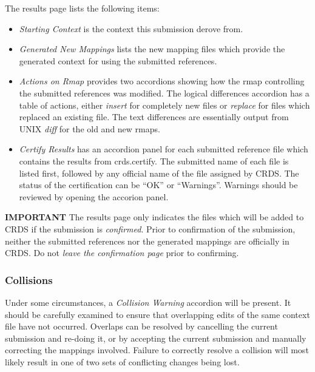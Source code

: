 \documentclass[letterpaper,10pt,english]{sphinxmanual}
\begin{document}
The results page lists the following items:
\begin{itemize}
\item {} 
\emph{Starting Context} is the context this submission derove from.

\item {} 
\emph{Generated New Mappings} lists the new mapping files which provide the generated context for using the submitted references.

\item {} 
\emph{Actions on Rmap} provides two accordions showing how the rmap controlling the submitted references was modified.   The logical differences accordion has a table of actions,  either \emph{insert} for completely new files or \emph{replace} for files which replaced an existing file.   The text differences are essentially output from UNIX \emph{diff} for the old and new rmaps.

\item {} 
\emph{Certify Results} has an accordion panel for each submitted reference file which contains the results from crds.certify.   The submitted name of each file is listed first,  followed by any official name of the file assigned by CRDS.   The status of the certification can be ``OK'' or ``Warnings''.   Warnings should be reviewed by opening the accorion panel.

\end{itemize}

\textbf{IMPORTANT}  The results page only indicates the files which will be added to
CRDS if the submission is \emph{confirmed}.   Prior to confirmation of the submission,
neither the submitted references nor the generated mappings are officially in CRDS.
Do not \emph{leave the confirmation page} prior to confirming.


\subsubsection{Collisions}
\label{web_site_use:collisions}
Under some circumstances,  a \emph{Collision Warning} accordion will be present.
It should be carefully examined to ensure that overlapping edits of the
same context file have not occurred.   Overlaps can be resolved by cancelling
the current submission and re-doing it, or by accepting the current submission
and manually correcting the mappings involved.   Failure to correctly resolve
a collision will most likely result in one of two sets of conflicting changes
being lost.
\begin{figure}[htbp]
\centering

\end{figure}
\end{document}
